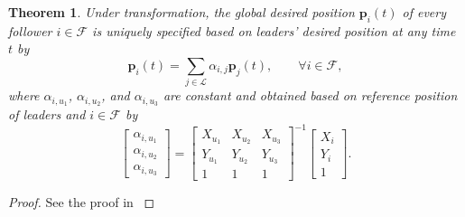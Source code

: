 \documentclass[journal]{IEEEtran}
\theoremstyle{definition}
\theoremstyle{plain}
\newtheorem{theorem}{Theorem}
\begin{document}
\begin{theorem}
    Under transformation, the global desired position $\mathbf{p}_i(t)$ of every follower $i\in \mathcal{F}$ is uniquely specified based on leaders' desired position at any time $t$ by
    \begin{equation}\label{leader-followerdesired}
        \mathbf{p}_i(t)=\sum_{j\in \mathcal{L}}\alpha_{i,j}\mathbf{p}_j(t),\qquad \forall i\in \mathcal{F},
    \end{equation}
    where $\alpha_{i,u_1}$, $\alpha_{i,u_2}$, and $\alpha_{i,u_3}$ are constant and obtained based on reference position of leaders and $i\in \mathcal{F}$ by
    \begin{equation}
        \begin{bmatrix}
            \alpha_{i,u_1}\\
            \alpha_{i,u_2}\\
            \alpha_{i,u_3}
        \end{bmatrix}
        =\begin{bmatrix}
        X_{u_1}&X_{u_2}&X_{u_3}\\
        Y_{u_1}&Y_{u_2}&Y_{u_3}\\
        1&1&1
        \end{bmatrix}
        ^{-1}
        \begin{bmatrix}
        X_i\\
        Y_i\\
        1
        \end{bmatrix}
        .
    \end{equation}        
\end{theorem}
\begin{proof}
    See the proof in \cite{rastgoftar2022integration, rastgoftar2021safe, rastgoftar2021scalable}
\end{proof}
\end{document}
